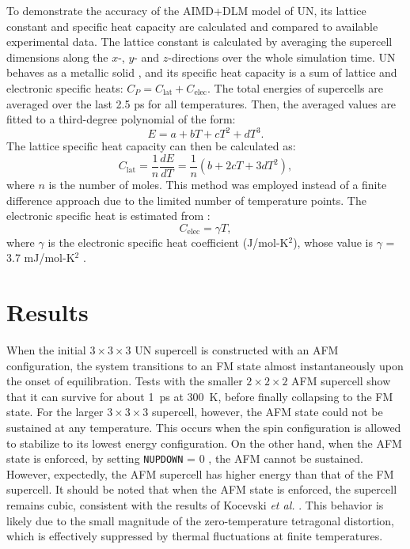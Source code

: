 \documentclass[preprint, 12pt]{elsarticle}
\newcommand{\?}{\stackrel{?}{=}}
\begin{document}
To demonstrate the accuracy of the AIMD+DLM model of UN, its lattice constant and specific heat capacity are calculated and compared to available experimental data. The lattice constant is calculated by averaging the supercell dimensions along the $x$-, $y$- and $z$-directions over the whole simulation time. UN behaves as a metallic solid \cite{Yang2021}, and its specific heat capacity is a sum of lattice and electronic specific heats: $C_P = C_\mathrm{lat} + C_\mathrm{elec}$. The total energies of supercells are averaged over the last 2.5 ps for all temperatures. Then, the averaged values are fitted to a third-degree polynomial of the form:
\begin{equation}
E = a + b T + c T^2 + d T^3.
\end{equation}
The lattice specific heat capacity can then be calculated as:
\begin{equation}
C_\mathrm{lat} = \frac{1}{n} \frac{dE}{dT} = \frac{1}{n} \left( b + 2 c T + 3 d T^2 \right),
\end{equation}
where $n$ is the number of moles. This method was employed instead of a finite difference approach due to the limited number of temperature points. The electronic specific heat is estimated from \cite{Gopal1966}:
\begin{equation}
C_\mathrm{elec} = \gamma T,
\end{equation}
where $\gamma$ is the electronic specific heat coefficient (J/mol-K$^2$), whose value is $\gamma$ = 3.7 mJ/mol-K$^2$ \cite{Samsel2007,AbdulHameed2024}.

\section{Results}

When the initial $3 \times 3 \times 3$ UN supercell is constructed with an AFM configuration, the system transitions to an FM state almost instantaneously upon the onset of equilibration. Tests with the smaller $2 \times 2 \times 2$ AFM supercell show that it can survive for about 1~ps at 300~K, before finally collapsing to the FM state. For the larger $3 \times 3 \times 3$ supercell, however, the AFM state could not be sustained at any temperature. This occurs when the spin configuration is allowed to stabilize to its lowest energy configuration. On the other hand, when the AFM state is enforced, by setting \verb|NUPDOWN| = 0 \cite{NUPDOWN}, the AFM cannot be sustained. However, expectedly, the AFM supercell has higher energy than that of the FM supercell. It should be noted that when the AFM state is enforced, the supercell remains cubic, consistent with the results of Kocevski \textit{et al.} \cite{Kocevski2022I}. This behavior is likely due to the small magnitude of the zero-temperature tetragonal distortion, which is effectively suppressed by thermal fluctuations at finite temperatures.
\end{document}
